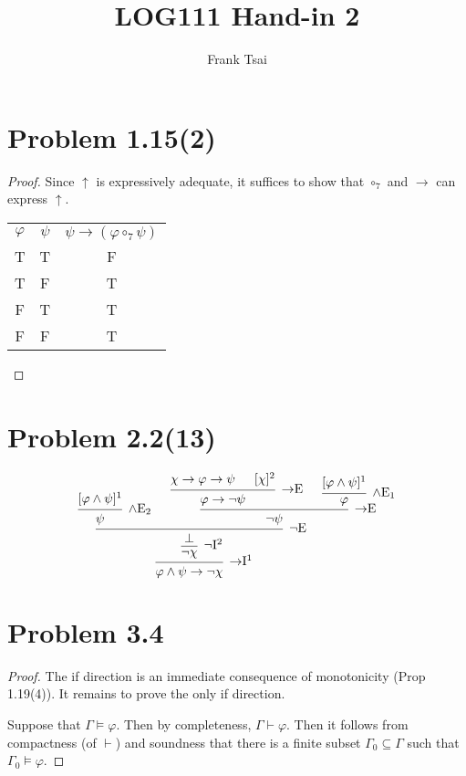 \documentclass[a4paper]{article}
\title{LOG111 Hand-in 2}
\author{Frank Tsai}
\begin{document}
\maketitle

\section{Problem 1.15(2)}
\begin{proof}
  Since $\uparrow$ is expressively adequate, it suffices to show that $\circ_{7}$ and $\to$ can express $\uparrow$.
  \begin{center}
    \begin{tabular}[h]{cc|c}
      $\varphi$ & $\psi$ & $\psi \to (\varphi \circ_{7} \psi)$\\
      T & T & F\\
      T & F & T\\
      F & T & T\\
      F & F & T\\
    \end{tabular}
  \end{center}
\end{proof}

\section{Problem 2.2(13)}\label{sec:problem2}
\[
  \begin{prooftree}
    \hypo{[\varphi \wedge \psi]^{1}}
    \infer1[$\wedge$E$_{2}$]{\psi}
    \hypo{\chi \to \varphi \to \psi}
    \hypo{[\chi]^{2}}
    \infer2[$\to$E]{\varphi \to \lnot \psi}
    \hypo{[\varphi \wedge \psi]^{1}}
    \infer1[$\wedge$E$_{1}$]{\varphi}
    \infer2[$\to$E]{\lnot \psi}
    \infer2[$\lnot$E]{\bot}
    \infer1[$\lnot$I$^{2}$]{\lnot \chi}
    \infer1[$\to$I$^{1}$]{\varphi \wedge \psi \to \lnot \chi}
  \end{prooftree}
\]

\section{Problem 3.4}
\begin{proof}
  The if direction is an immediate consequence of monotonicity (Prop 1.19(4)).
  It remains to prove the only if direction.
  
  Suppose that $\Gamma \models \varphi$.
  Then by completeness, $\Gamma \vdash \varphi$.
  Then it follows from compactness (of $\vdash$) and soundness that there is a finite subset $\Gamma_{0} \subseteq \Gamma$ such that $\Gamma_{0} \models \varphi$.
\end{proof}
\end{document}
